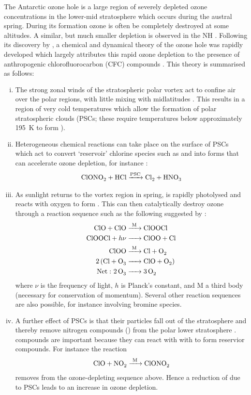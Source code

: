The Antarctic ozone hole is a large region of severely depleted ozone
concentrations in the lower-mid stratosphere which occurs during the austral
spring. During its formation ozone is often be completely destroyed at some
altitudes. A similar, but much smaller depletion is observed in the NH
\citep[e.g.,][]{Manney1997}. Following its discovery by \citet{Farman1985}, a
chemical and dynamical theory of the ozone hole was rapidly developed which
largely attributes this rapid ozone depletion to the presence of anthropogenic
chlorofluorocarbon (CFC) compounds \citep{McElroy1986,Solomon1986}. This theory
is summarised as follows:
\begin{enumerate}[i.]
\item The strong zonal winds of the stratospheric polar vortex act to confine
  air over the polar regions, with little mixing with midlatitudes
  \citep{Schoeberl1991}. This results in a region of very cold temperatures
  which allow the formation of polar stratospheric clouds (PSCs; these require
  temperatures below approximately 195~K to form \citep{Newman2010}).
\item Heterogeneous chemical reactions can take place on the surface of PSCs which
  act to convert `reservoir' chlorine species such as  and 
  into forms that can accelerate ozone depletion, for instance
  \citep{Solomon1986}:
  \begin{equation*}
    \ce{ClONO2 + HCl ->[\ce{PSC}] Cl2 + HNO3}
  \end{equation*}
\item As sunlight returns to the vortex region in spring,  is rapidly
  photolysed and reacts with oxygen to form . This can then
  catalytically destroy ozone through a reaction sequence such as the following
  suggested by \citet{Molina1987}:
  \begin{align*}
    \cee{ClO + ClO &->[\ce{M}] ClOOCl \\
         ClOOCl + $h\nu$ &-> ClOO + Cl \\
         ClOO &->[\ce{M}] Cl + O2 \\
         2(Cl + O3 &-> ClO + O2) \\
         $\mathrm{Net:~}$ 2O3 &-> 3O2} 
  \end{align*}
  where $\nu$ is the frequency of light,
  $h$ is Planck's constant, and M a third body (necessary for conservation of
  momentum). Several other reaction sequences are also possible, for instance
  involving bromine species.

\item A further effect of PSCs is that their particles fall out of the
  stratosphere and thereby remove nitrogen compounds
  () from the polar lower stratosphere \citep{Toon1986}.
   compounds are important because they can react with with 
  to form reservior compounds. For instance the reaction
  \begin{equation*}
    \ce{ClO + NO2 ->[\ce{M}] ClONO2}
  \end{equation*}
  removes  from the ozone-depleting sequence above. Hence a reduction of
   due to PSCs leads to an increase in ozone depletion.


\end{enumerate}
